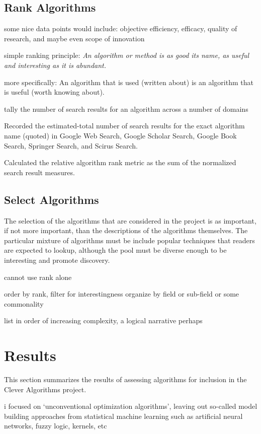 \documentclass[a4paper, 11pt]{article}
\begin{document}
% 
% 
\subsection{Rank Algorithms}
some nice data points would include: objective efficiency, efficacy, quality of research, and maybe even scope of innovation

simple ranking principle: \emph{An algorithm or method is as good its name, as useful and interesting as it is abundant.}

more specifically: An algorithm that is used (written about) is an algorithm that is useful (worth knowing about).

tally the number of search results for an algorithm across a number of domains

Recorded the estimated-total number of search results for the exact algorithm name (quoted) in Google Web Search, Google Scholar Search, Google Book Search, Springer Search, and Scirus Search.

Calculated the relative algorithm rank metric as the sum of the normalized search result measures.

% 
% 
\subsection{Select Algorithms}
The selection of the algorithms that are considered in the project is as important, if not more important, than the descriptions of the algorithms themselves. The particular mixture of algorithms must be include popular techniques that readers are expected to lookup, although the pool must be diverse enough to be interesting and promote discovery.

cannot use rank alone

order by rank, filter for interestingness
organize by field or sub-field or some commonality

list in order of increasing complexity, a logical narrative perhaps

% 
% 
\section{Results}
\label{sec:results}
This section summarizes the results of assessing algorithms for inclusion in the Clever Algorithms project.

i focused on `unconventional optimization algorithms', leaving out so-called model building approaches from statistical machine learning such as artificial neural networks, fuzzy logic, kernels, etc 
\end{document}
